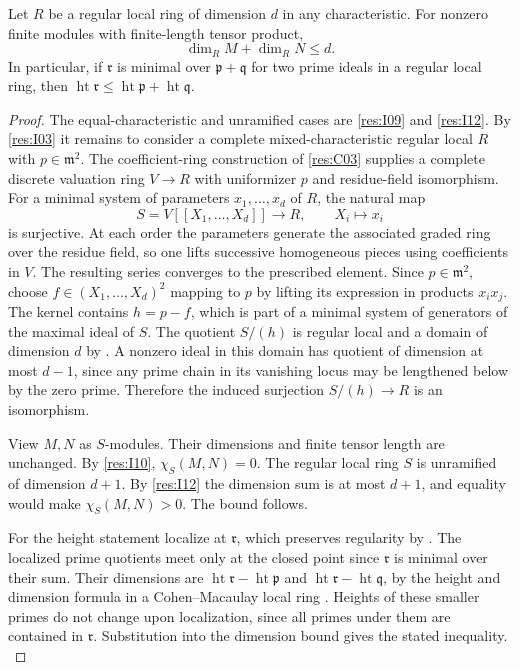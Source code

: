 \begin{theorem}\label{res:I13}
Let \(R\) be a regular local ring of dimension \(d\) in any
characteristic. For nonzero finite modules with finite-length
tensor product,
\[
 \dim_R M+\dim_R N\le d.
\]
In particular, if \(\mathfrak r\) is minimal over
\(\mathfrak p+\mathfrak q\) for two prime ideals in a regular
local ring, then
\(\operatorname{ht}\mathfrak r\le
  \operatorname{ht}\mathfrak p+\operatorname{ht}\mathfrak q\).
\end{theorem}
\begin{proof}
The equal-characteristic and unramified cases are
\ref{res:I09} and \ref{res:I12}. By \ref{res:I03} it remains
to consider a complete mixed-characteristic regular local \(R\)
with \(p\in\mathfrak m^2\). The coefficient-ring construction
of \ref{res:C03} supplies a complete discrete valuation ring
\(V\to R\) with uniformizer \(p\) and residue-field isomorphism.
For a minimal system of parameters \(x_1,\ldots,x_d\) of \(R\),
the natural map
\[
 S=V[[X_1,\ldots,X_d]]\longrightarrow R,\qquad X_i\longmapsto x_i
\]
is surjective. At each order the parameters generate the
associated graded ring over the residue field, so one lifts
successive homogeneous pieces using coefficients in \(V\).
The resulting series converges to the prescribed element.
Since \(p\in\mathfrak m^2\), choose \(f\in (X_1,\ldots,X_d)^2\)
mapping to \(p\) by lifting its expression in products \(x_ix_j\).
The kernel contains \(h=p-f\), which is part of a minimal
system of generators of the maximal ideal of \(S\).
The quotient \(S/(h)\) is regular local and a domain of
dimension \(d\) by \cite[ALG-05-C03-S03]{p103}. A nonzero
ideal in this domain has quotient of dimension at most
\(d-1\), since any prime chain in its vanishing locus may be
lengthened below by the zero prime. Therefore the induced
surjection \(S/(h)\to R\) is an isomorphism.

View \(M,N\) as \(S\)-modules. Their dimensions and finite
tensor length are unchanged. By \ref{res:I10},
\(\chi_S(M,N)=0\). The regular local ring \(S\) is unramified
of dimension \(d+1\). By \ref{res:I12} the dimension sum is
at most \(d+1\), and equality would make \(\chi_S(M,N)>0\).
The bound follows.

For the height statement localize at \(\mathfrak r\), which
preserves regularity by \cite[CM-19]{core}. The localized
prime quotients meet only at the closed point since
\(\mathfrak r\) is minimal over their sum. Their dimensions are
\(\operatorname{ht}\mathfrak r-\operatorname{ht}\mathfrak p\)
and \(\operatorname{ht}\mathfrak r-\operatorname{ht}\mathfrak q\),
by the height and dimension formula in a Cohen--Macaulay local
ring \cite[CM-07]{core}. Heights of these smaller primes do
not change upon localization, since all primes under them
are contained in \(\mathfrak r\). Substitution into the
dimension bound gives the stated inequality.
\cite[Chapter V, \S B.6]{serre-local}
\end{proof}


